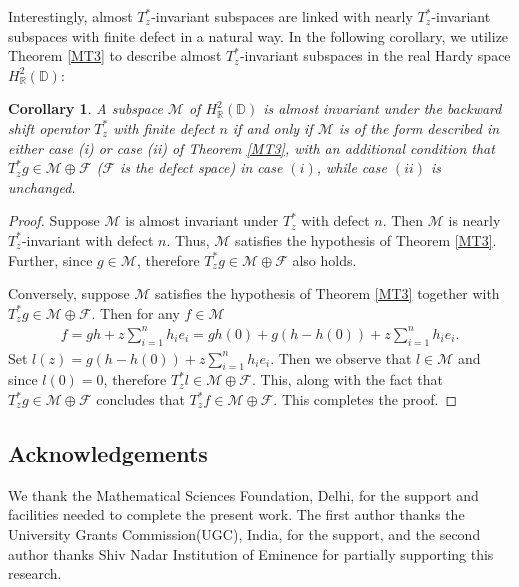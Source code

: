 \documentclass[11pt]{amsart}
\newtheorem{corollary}[theorem]{Corollary}
\numberwithin{equation}{section}
\begin{document}
\textnormal{Interestingly, almost $T^*_z$-invariant subspaces are linked with nearly $T^*_z$-invariant subspaces with finite defect in a natural way.
In the following corollary, we utilize Theorem \ref{MT3} to describe almost $T^*_z$-invariant subspaces in the real Hardy space $H^2_{\mathbb{R}}(\mathbb{D})$:}
\begin{corollary}\label{CorA}
A subspace $\mathcal{M}$ of $H^2_{\mathbb{R}}(\mathbb{D})$ is almost invariant under the backward shift operator $T^*_z$ with finite defect $n$ if and only if $\mathcal{M}$ is of the form described in either case (i) or case (ii) of Theorem \ref{MT3}, with an additional condition that $T^*_zg \in \mathcal{M} \oplus \mathcal{F}$ ($\mathcal{F}$ is the defect space) in case $(i)$, while case $(ii)$ is unchanged.  
\end{corollary}
\begin{proof}
 Suppose $\mathcal{M}$ is almost invariant under $T^*_z$ with defect $n$. Then $\mathcal{M}$ is nearly $T^*_z$-invariant with defect $n$. Thus, $\mathcal{M}$ satisfies the hypothesis of Theorem \ref{MT3}. Further, since $g \in \mathcal{M}$, therefore $T^*_zg \in \mathcal{M} \oplus \mathcal{F}$ also holds.

 
  Conversely, suppose $\mathcal{M}$ satisfies the hypothesis of Theorem \ref{MT3} together with $T^*_zg \in \mathcal{M} \oplus \mathcal{F}$. Then for any $f \in \mathcal{M}$
\begin{eqnarray*}
     f=gh + z\sum_{i=1}^{n} h_i e_i=gh(0) + g(h - h(0)) + z\sum_{i=1}^{n} h_i e_i.
\end{eqnarray*}
Set $l(z)=g(h - h(0)) + z\sum_{i=1}^{n} h_i e_i$. Then we observe that $l \in \mathcal{M}$ and since $l(0)=0$, therefore $T^*_zl \in \mathcal{M} \oplus \mathcal{F}$. This, along with the fact that $T^*_zg \in \mathcal{M} \oplus \mathcal{F}$ concludes that $T^*_zf \in\mathcal{M} \oplus \mathcal{F}$. This completes the proof.

\end{proof}


\subsection*{Acknowledgements}
We thank the Mathematical Sciences Foundation, Delhi, for the support and facilities needed to complete the present work. The first author thanks the University Grants Commission(UGC), India, for the support, and the second author thanks Shiv Nadar Institution of Eminence for partially supporting this research.
\end{document}
